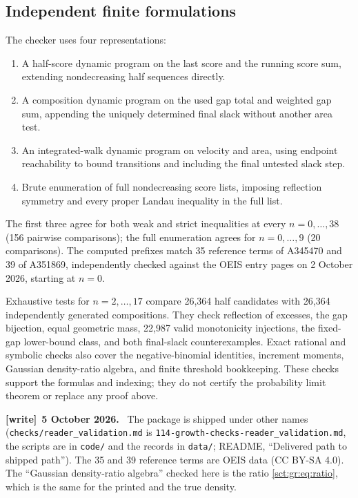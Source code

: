 \documentclass[11pt,letterpaper]{article}
\newcommand{\file}[1]{\nolinkurl{#1}}
\theoremstyle{definition}\newtheorem{remark}[theorem]{Remark}
\newenvironment{writenote}[1][]{\par\smallskip\begingroup\small
 \noindent\textbf{[write]}\if\relax\detokenize{#1}\relax\else~\textbf{#1.}\fi\ }%
 {\par\endgroup\smallskip}
\begin{document}
\subsection{Independent finite formulations}

The checker uses four representations:
\begin{enumerate}
 \item A half-score dynamic program on the last score and the running score sum,
 extending nondecreasing half sequences directly.
 \item A composition dynamic program on the used gap total and weighted gap sum,
 appending the uniquely determined final slack without another area test.
 \item An integrated-walk dynamic program on velocity and area, using endpoint
 reachability to bound transitions and including the final untested slack step.
 \item Brute enumeration of full nondecreasing score lists, imposing reflection
 symmetry and every proper Landau inequality in the full list.
\end{enumerate}
The first three agree for both weak and strict inequalities at every
$n=0,\ldots,38$ (156 pairwise comparisons); the full enumeration agrees for
$n=0,\ldots,9$ (20 comparisons). The computed prefixes match 35 reference
terms of A345470 and 39 of A351869, independently checked against the OEIS
entry pages on 2 October 2026, starting at $n=0$.

Exhaustive tests for $n=2,\ldots,17$ compare 26,364 half candidates with
26,364 independently generated compositions. They check reflection of
excesses, the gap bijection, equal geometric mass, 22,987 valid monotonicity
injections, the fixed-gap lower-bound class, and both final-slack
counterexamples. Exact rational and symbolic checks also cover the
negative-binomial identities, increment moments, Gaussian density-ratio
algebra, and finite threshold bookkeeping. These checks support the formulas
and indexing; they do not certify the probability limit theorem or replace
any proof above.
\begin{writenote}[5 October 2026]
The package is shipped under other names (\file{checks/reader_validation.md} is \file{114-growth-checks-reader_validation.md}, the scripts are in \file{code/} and the records in \file{data/}; README, ``Delivered path to shipped path''). The 35 and 39 reference terms are OEIS data (CC BY-SA 4.0). The ``Gaussian density-ratio algebra'' checked here is the ratio \eqref{sct:gr:eq:ratio}, which is the same for the printed and the true density.
\end{writenote}
\end{document}
